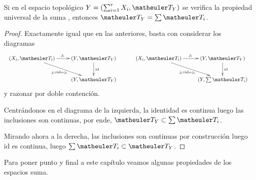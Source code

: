 \begin{lem}
	Si en el espacio topológico $Y=(\sum_{i=1}^rX_i,\T_Y)$ se verifica la propiedad universal de la suma , entonces $\T_Y=\sum\T_i$.
\end{lem}
\begin{proof}
	Exactamente igual que en las anteriores, basta con considerar los diagramas
	\begin{equation*}
		\begin{array}{cc}
			\xymatrix{
				(X_i,\T_i)\ar[r]^{j_i} \ar[rd]_{j_i\circ\text{id}=j_i}& (Y,\T_Y) \ar[d]^{\text{id}}\\
				& (Y,\T_Y)
			} \qquad&
			\xymatrix{
				(X_i,\T_i)\ar[r]^{j_i} \ar[rd]_{j_i\circ\text{id}=j_i} & (Y,\T_Y) \ar[d]^{\text{id}}\\
				& (Y,\sum\T_i)
			}
		\end{array}
	\end{equation*}
	y razonar por doble contención.
	
	Centrándonos en el diagrama de la izquierda, la identidad es continua luego las inclusiones son continuas, por ende, $\T_Y\subset\sum\T_i$.
	
	Mirando ahora a la derecha, las inclusiones son continuas por construcción luego $\text{id}$ es continua, luego $\sum\T_i\subset \T_Y$.
\end{proof}
Para poner punto y final a este capítulo veamos algunas propiedades de los espacios suma.

